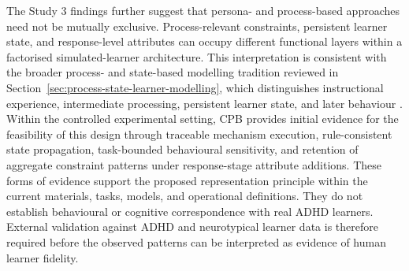The Study 3 findings further suggest that persona- and process-based approaches need not be mutually exclusive. Process-relevant constraints, persistent learner state, and response-level attributes can occupy different functional layers within a factorised simulated-learner architecture. This interpretation is consistent with the broader process- and state-based modelling tradition reviewed in Section~\ref{sec:process-state-learner-modelling}, which distinguishes instructional experience, intermediate processing, persistent learner state, and later behaviour \cite{anderson-etal-1995-cognitive,abdelrahman-etal-2023-knowledge}. Within the controlled experimental setting, CPB provides initial evidence for the feasibility of this design through traceable mechanism execution, rule-consistent state propagation, task-bounded behavioural sensitivity, and retention of aggregate constraint patterns under response-stage attribute additions. These forms of evidence support the proposed representation principle within the current materials, tasks, models, and operational definitions. They do not establish behavioural or cognitive correspondence with real ADHD learners. External validation against ADHD and neurotypical learner data is therefore required before the observed patterns can be interpreted as evidence of human learner fidelity.
\FloatBarrier
\endgroup
\fussy
